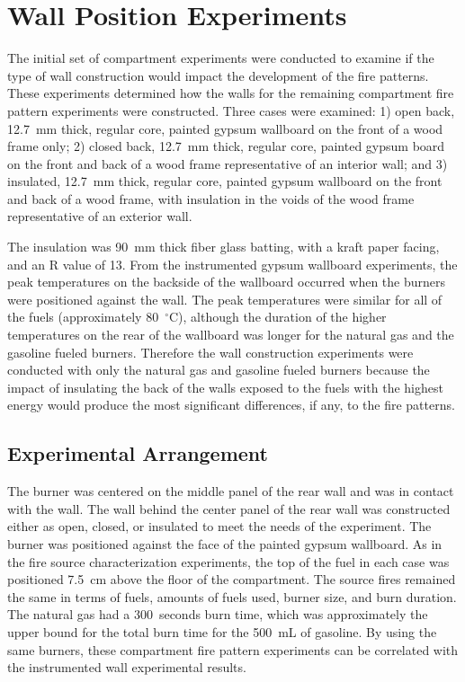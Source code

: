 \documentclass[twoside]{uocthesis}
\begin{document}
{\section{Wall Position Experiments}

 The initial set of compartment experiments were conducted to examine if the type of wall construction would impact the development of the fire patterns. These experiments determined how the walls for the remaining compartment fire pattern experiments were constructed.  Three cases were examined: 1) open back, 12.7~mm thick, regular core, painted gypsum wallboard on the front of a wood frame only; 2) closed back, 12.7~mm thick, regular core, painted gypsum board on the front and back of a wood frame representative of an interior wall; and 3) insulated, 12.7~mm thick, regular core, painted gypsum wallboard on the front and back of a wood frame, with insulation in the voids of the wood frame representative of an exterior wall. 

 The insulation was 90~mm thick fiber glass batting, with a kraft paper facing, and an R value of 13.  From the instrumented gypsum wallboard experiments, the peak temperatures on the backside of the wallboard occurred when the burners were positioned against the wall.  The peak temperatures were similar for all of the fuels (approximately 80~$^\circ$C), although the duration of the higher temperatures on the rear of the wallboard was longer for the natural gas and the gasoline fueled burners. Therefore the wall construction experiments were conducted with only the natural gas and gasoline fueled burners because the impact of insulating the back of the walls exposed to the fuels with the highest energy would produce the most significant differences, if any, to the fire patterns.


\subsection{Experimental Arrangement}

The burner was centered on the middle panel of the rear wall and was in contact with the wall. The wall behind the center panel of the rear wall was constructed either as open, closed, or insulated to meet the needs of the experiment. The burner was positioned against the face of the painted gypsum wallboard. As in the fire source characterization experiments, the top of the fuel in each case was positioned 7.5~cm above the floor of the compartment. The source fires remained the same in terms of fuels, amounts of fuels used, burner size, and burn duration.  The natural gas had a 300~seconds burn time, which was approximately the upper bound for the total burn time for the 500~mL of gasoline.  By using the same burners, these compartment fire pattern experiments can be correlated with the instrumented wall experimental results.

}
\end{document}

